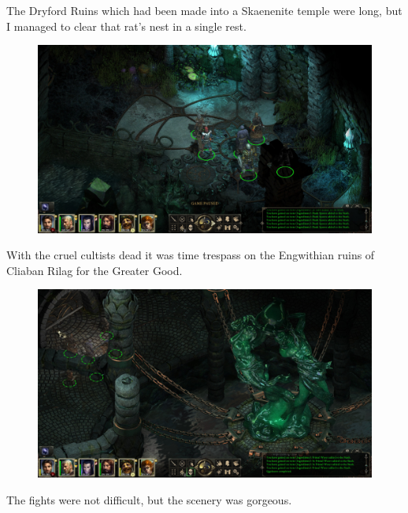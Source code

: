 \documentclass{article}
\begin{document}
The Dryford Ruins which had been made into a Skaenenite temple were long, but I managed to clear that rat's nest in a single rest.

\begin{figure}
\includegraphics[scale=0.33]{files/blog/2018_11_25_pillars_of_eternity_path_of_the_damned_act_ii/2018_11_25_cliabanrilag1.jpg}
\end{figure}

With the cruel cultists dead it was time trespass on the Engwithian ruins of Cliaban Rilag for the Greater Good.

\begin{figure}
\includegraphics[scale=0.33]{files/blog/2018_11_25_pillars_of_eternity_path_of_the_damned_act_ii/2018_11_25_cliabanrilag2.jpg}
\end{figure}

The fights were not difficult, but the scenery was gorgeous.
\end{document}
